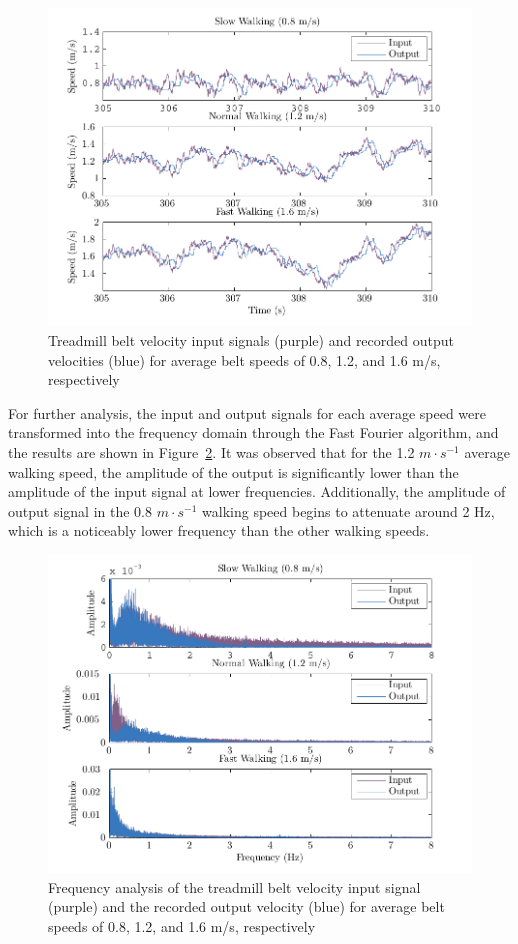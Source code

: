 \documentclass{article}
\begin{document}
\begin{figure}
  \includegraphics{figures/input_vs_output.pdf}
  \caption{Treadmill belt velocity input signals (purple) and recorded output 
                velocities (blue) for average belt speeds of 0.8, 1.2, and 1.6 m/s,
                respectively}
  \label{fig:input_output}
\end{figure}

For further analysis, the input and output signals for each average speed were
transformed into the frequency domain through the Fast Fourier algorithm, and 
the results are shown in Figure~\ref{fig:freq_analysis}.  It was observed that for
the 1.2 $m \cdot s^{-1}$ average walking speed, the amplitude of the output is 
significantly lower than the amplitude of the input signal at lower frequencies.  
Additionally, the amplitude of output signal in the 0.8 $m \cdot s^{-1}$ walking
speed begins to attenuate around 2 Hz, which is a noticeably lower frequency than
the other walking speeds.  

\begin{figure}
  \includegraphics{figures/frequency_analysis.pdf}
  \caption{Frequency analysis of the treadmill belt velocity input signal 
                 (purple) and the recorded output velocity (blue)
                for average belt speeds of 0.8, 1.2, and 1.6 m/s, respectively}
  \label{fig:freq_analysis}
\end{figure}
\end{document}
